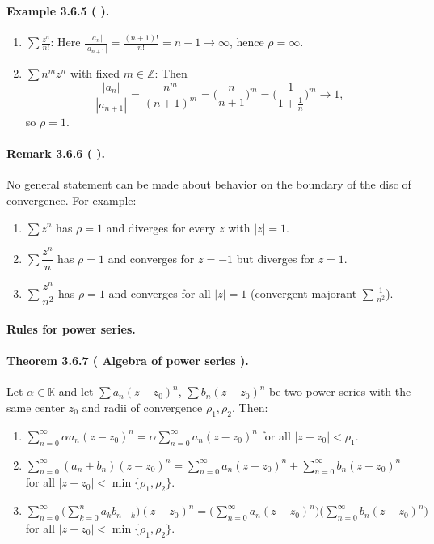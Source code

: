 \documentclass[12pt,a4paper]{article}
\newcommand{\Z}{\mathbb{Z}}
\newcommand{\K}{\mathbb{K}} %
\newcommand{\NumberedTheorem}[3]{%
\paragraph*{Theorem #1 ( #2 ).} #3\par}
\newcommand{\NumberedExample}[3]{%
\paragraph*{Example #1 ( #2 ).} #3\par}
\newcommand{\NumberedRemark}[3]{%
\paragraph*{Remark #1 ( #2 ).} #3\par}
\theoremstyle{plain}
\theoremstyle{definition}
\theoremstyle{remark}
\begin{document}
\NumberedExample{3.6.5}{}{
\begin{enumerate}[label={(\arabic*)}, leftmargin=*]
	\item $\displaystyle \sum \frac{z^{n}}{n!}$: Here $\frac{|a_n|}{|a_{n+1}|} = \frac{(n+1)!}{n!} = n+1 \to \infty$, hence $\rho=\infty$.
	\item $\displaystyle \sum n^{m} z^{n}$ with fixed $m\in\Z$: Then
	\[
		\frac{|a_n|}{|a_{n+1}|} = \frac{n^{m}}{(n+1)^{m}} = \Big(\frac{n}{n+1}\Big)^{m} = \Big( \frac{1}{1+\tfrac{1}{n}} \Big)^{m} \longrightarrow 1,
	\]
	so $\rho=1$.
\end{enumerate}}

\NumberedRemark{3.6.6}{}{No general statement can be made about behavior on the boundary of the disc of convergence. For example:
\begin{enumerate}[label={(\arabic*)}, leftmargin=*]
	\item $\sum z^{n}$ has $\rho=1$ and diverges for every $z$ with $|z|=1$.
	\item $\sum \dfrac{z^{n}}{n}$ has $\rho=1$ and converges for $z=-1$ but diverges for $z=1$.
	\item $\sum \dfrac{z^{n}}{n^{2}}$ has $\rho=1$ and converges for all $|z|=1$ (convergent majorant $\sum \tfrac{1}{n^{2}}$).
\end{enumerate}}

\paragraph{Rules for power series.}

\NumberedTheorem{3.6.7}{Algebra of power series}{Let $\alpha\in\K$ and let $\sum a_n (z-z_0)^n$, $\sum b_n (z-z_0)^n$ be two power series with the same center $z_0$ and radii of convergence $\rho_1,\rho_2$. Then:
\begin{enumerate}[label={(\arabic*)}, leftmargin=*]
	\item $\displaystyle \sum_{n=0}^{\infty} \alpha a_n (z-z_0)^n = \alpha \sum_{n=0}^{\infty} a_n (z-z_0)^n$ for all $|z-z_0|<\rho_1$.
	\item $\displaystyle \sum_{n=0}^{\infty} (a_n+b_n)(z-z_0)^n = \sum_{n=0}^{\infty} a_n (z-z_0)^n + \sum_{n=0}^{\infty} b_n (z-z_0)^n$ for all $|z-z_0|<\min\{\rho_1,\rho_2\}$.
	\item $\displaystyle \sum_{n=0}^{\infty} \Big( \sum_{k=0}^{n} a_k b_{n-k} \Big) (z-z_0)^n 
		= \Big( \sum_{n=0}^{\infty} a_n (z-z_0)^n \Big) \Big( \sum_{n=0}^{\infty} b_n (z-z_0)^n \Big)$ for all $|z-z_0|<\min\{\rho_1,\rho_2\}$.
\end{enumerate}}
\end{document}
